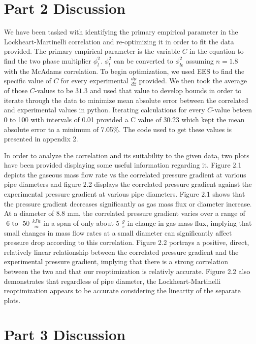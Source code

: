 \documentclass[10pt]{article}
\begin{document}
\section{Part 2 Discussion}
\par
We have been tasked with identifying the primary empirical parameter in the Lockheart-Martinelli correlation and re-optimizing it in order to fit the data provided. The primary empirical parameter is the variable \(C\) in the equation to find the two phase multiplier $\phi_l^2$. $\phi_l^2$ can be converted to $\phi_{lo}^2$ assuming \(n = 1.8\) with the McAdams correlation. To begin optimization, we used EES to find the specific value of \(C\) for every 
experimental $\frac{dp}{dz}$ provided. We then took the average of those \(C\)-values to be \(31.3\) and used that value to develop bounds in order to iterate through the data to minimize mean absolute error between the correlated and experimental values in python. Iterating calculations for every \(C\)-value beteen 0 to 100 with intervals of  0.01 provided a C value of 30.23 which kept the mean absolute error to a minimum of 7.05\%. The code used to get these values is presented in appendix 2.
\par
In order to analyze the correlation and its suitability to the given data, two plots have been provided displaying some useful information regarding it. 
Figure 2.1 depicts the gaseous mass flow rate vs the correlated pressure gradient at various pipe diameters and figure 2.2 displays the correlated pressure gradient
against the experimental pressure gradient at various pipe diameters. Figure 2.1 shows that the pressure gradient decreases significantly as gas mass flux or 
diameter increase. At a diameter of 8.8 mm, the correlated pressure gradient varies over a range of -6 to -50 $\frac{kPa}{m}$ in a span of only about 5 $\frac{g}{s}$ in change in gas mass flux, implying that small changes in mass flow rates at a small diameter can significantly affect pressure drop according to this correlation. Figure 2.2 portrays a positive, direct, relatively linear relationship between the correlated pressure gradient and the experimental pressure gradient, implying that there is a strong correlation between the two and that our reoptimization is relativly accurate. Figure 2.2 also demonstrates that regardless 
of pipe diameter, the Lockheart-Martinelli reoptimization appears to be accurate considering the linearity of the separate plots. 

\section{Part 3 Discussion}
\end{document}
